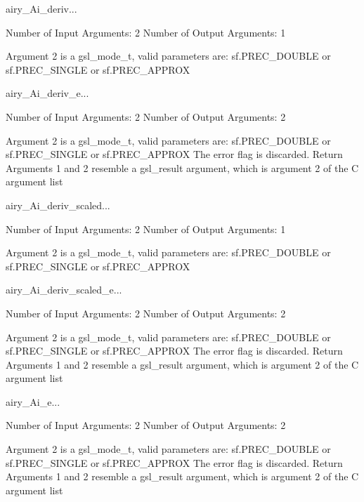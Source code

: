 \begin{funcdesc}{airy_Ai_deriv}{...}

    Number of Input  Arguments:  2
    Number of Output Arguments:  1

 Argument 2 is a gsl_mode_t, valid parameters are:
	sf.PREC_DOUBLE or sf.PREC_SINGLE or sf.PREC_APPROX

\end{funcdesc}

\begin{funcdesc}{airy_Ai_deriv_e}{...}

    Number of Input  Arguments:  2
    Number of Output Arguments:  2

 Argument 2 is a gsl_mode_t, valid parameters are:
	sf.PREC_DOUBLE or sf.PREC_SINGLE or sf.PREC_APPROX
The error flag is discarded.
Return Arguments 1 and 2 resemble a gsl_result argument,
	which is  argument 2 of the C argument list

\end{funcdesc}

\begin{funcdesc}{airy_Ai_deriv_scaled}{...}

    Number of Input  Arguments:  2
    Number of Output Arguments:  1

 Argument 2 is a gsl_mode_t, valid parameters are:
	sf.PREC_DOUBLE or sf.PREC_SINGLE or sf.PREC_APPROX

\end{funcdesc}

\begin{funcdesc}{airy_Ai_deriv_scaled_e}{...}

    Number of Input  Arguments:  2
    Number of Output Arguments:  2

 Argument 2 is a gsl_mode_t, valid parameters are:
	sf.PREC_DOUBLE or sf.PREC_SINGLE or sf.PREC_APPROX
The error flag is discarded.
Return Arguments 1 and 2 resemble a gsl_result argument,
	which is  argument 2 of the C argument list

\end{funcdesc}

\begin{funcdesc}{airy_Ai_e}{...}

    Number of Input  Arguments:  2
    Number of Output Arguments:  2

 Argument 2 is a gsl_mode_t, valid parameters are:
	sf.PREC_DOUBLE or sf.PREC_SINGLE or sf.PREC_APPROX
The error flag is discarded.
Return Arguments 1 and 2 resemble a gsl_result argument,
	which is  argument 2 of the C argument list

\end{funcdesc}

